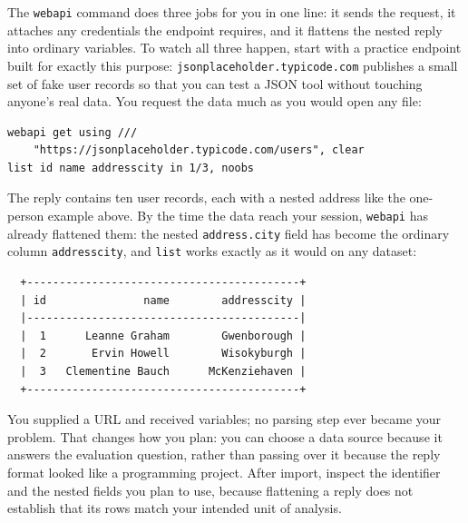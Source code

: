 \documentclass[
    a4paper,
    fontsize=10pt,
    twoside=true,
    numbers=noenddot,
]{kaobook}
\begin{document}
The \texttt{webapi} command does three jobs for you in one line: it sends the request, it attaches any credentials the endpoint requires, and it flattens the nested reply into ordinary variables. To watch all three happen, start with a practice endpoint built for exactly this purpose: \texttt{jsonplaceholder.typicode.com} publishes a small set of fake user records so that you can test a JSON tool without touching anyone's real data. You request the data much as you would open any file:
\par
{\footnotesize
\begin{verbatim}
webapi get using ///
    "https://jsonplaceholder.typicode.com/users", clear
list id name addresscity in 1/3, noobs
\end{verbatim}
}
The reply contains ten user records, each with a nested address like the one-person example above. By the time the data reach your session, \texttt{webapi} has already flattened them: the nested \texttt{address.city} field has become the ordinary column \texttt{addresscity}, and \texttt{list} works exactly as it would on any dataset:
\par
{\footnotesize
\begin{verbatim}
  +------------------------------------------+
  | id               name        addresscity |
  |------------------------------------------|
  |  1      Leanne Graham        Gwenborough |
  |  2       Ervin Howell        Wisokyburgh |
  |  3   Clementine Bauch      McKenziehaven |
  +------------------------------------------+
\end{verbatim}
}
You supplied a URL and received variables; no parsing step ever became your problem. That changes how you plan: you can choose a data source because it answers the evaluation question, rather than passing over it because the reply format looked like a programming project. After import, inspect the identifier and the nested fields you plan to use, because flattening a reply does not establish that its rows match your intended unit of analysis.
\end{document}
